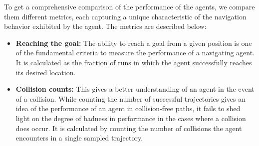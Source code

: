 To get a comprehensive comparison of the performance of the agents, we compare them  different metrics, each capturing a unique characteristic of the navigation behavior exhibited by the agent. The metrics are described below:
\begin{itemize}
        \item \textbf{Reaching the goal:} The ability to reach a goal from a given position is one of the fundamental criteria to measure the performance of a navigating agent. It is calculated as the fraction of runs in which the agent successfully reaches its desired location.        
        
        \item \textbf{Collision counts:} This gives a better understanding of an agent in the event of a collision. While counting the number of successful trajectories gives an idea of the performance of an agent in collision-free paths, it fails to shed light on the degree of badness in performance in the cases where a collision does occur. It is calculated by counting the number of collisions the agent encounters in a single sampled trajectory.
        


\end{itemize}

